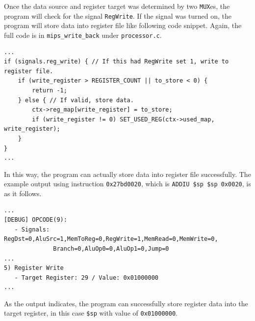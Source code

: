 \documentclass{homework}
\begin{document}
Once the data source and register target was determined by two \texttt{MUX}es, the program will check for the signal \texttt{RegWrite}. If the signal was turned on, the program will store data into register file like following code snippet. Again, the full code is in \texttt{mips_write_back} under \texttt{processor.c}.
\\
\begin{center}
\begin{code}
\begin{verbatim}
...
if (signals.reg_write) { // If this had RegWrite set 1, write to register file.
    if (write_register > REGISTER_COUNT || to_store < 0) { 
        return -1;
    } else { // If valid, store data.
        ctx->reg_map[write_register] = to_store;
        if (write_register != 0) SET_USED_REG(ctx->used_map, write_register);
    }
}
...
\end{verbatim}
\end{code}
\end{center}
In this way, the program can actually store data into register file successfully. The example output using instruction \texttt{0x27bd0020}, which is \texttt{ADDIU \$sp \$sp 0x0020}, is as it follows.
\pagebreak
\\
\begin{center}
\begin{code}
\begin{verbatim}
...
[DEBUG] OPCODE(9):
   - Signals: RegDst=0,AluSrc=1,MemToReg=0,RegWrite=1,MemRead=0,MemWrite=0,
              Branch=0,AluOp0=0,AluOp1=0,Jump=0
...
5) Register Write
   - Target Register: 29 / Value: 0x01000000
...
\end{verbatim}
\end{code}
\end{center}
As the output indicates, the program can successfully store register data into the target register, in this case \texttt{\$sp} with value of \texttt{0x01000000}. 
\end{document}
